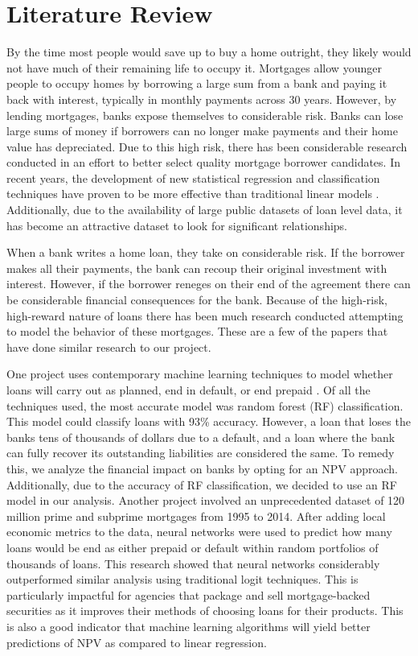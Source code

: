 \section{Literature Review}
{\color{red}
	By the time most people would save up to buy a home outright, they likely would not have much of their remaining life to occupy it. Mortgages allow younger people to occupy homes by borrowing a large sum from a bank and paying it back with interest, typically in monthly payments across 30 years. However, by lending mortgages, banks expose themselves to considerable risk. Banks can lose large sums of money if borrowers can no longer make payments and their home value has depreciated. Due to this high risk, there has been considerable research conducted in an effort to better select quality mortgage borrower candidates. In recent years, the development of new statistical regression and classification techniques have proven to be more effective than traditional linear models \cite{Sirignano}. Additionally, due to the availability of large public datasets of loan level data, it has become an attractive dataset to look for significant relationships. 
	
	When a bank writes a home loan, they take on considerable risk. If the borrower makes all their payments, the bank can recoup their original investment with interest. However, if the borrower reneges on their end of the agreement there can be considerable financial consequences for the bank. Because of the high-risk, high-reward nature of loans there has been much research conducted attempting to model the behavior of these mortgages. These are a few of the papers that have done similar research to our project.}
One project uses contemporary machine learning techniques to model whether loans will carry out as planned, end in default, or end prepaid \cite{Deng}. Of all the techniques used, the most accurate model was random forest (RF) classification. This model could classify loans with 93\% accuracy. However, a loan that loses the banks tens of thousands of dollars due to a default, and a loan where the bank can fully recover its outstanding liabilities are considered the same. To remedy this, we analyze the financial impact on banks by opting for an NPV approach. Additionally, due to the accuracy of RF classification, we decided to use an RF model in our analysis.  
Another project involved an unprecedented dataset of 120 million prime and subprime mortgages from 1995 to 2014\cite{Sirignano}. After adding local economic metrics to the data, neural networks were used to predict how many loans would be end as either prepaid or default within random portfolios of thousands of loans. This research showed that neural networks considerably outperformed similar analysis using traditional logit techniques. This is particularly impactful for agencies that package and sell mortgage-backed securities as it improves their methods of choosing loans for their products. This is also a good indicator that machine learning algorithms will yield better predictions of NPV as compared to linear regression.


